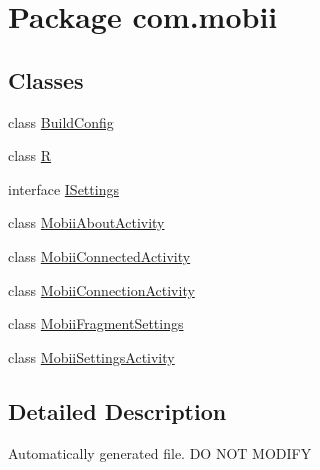 \hypertarget{namespacecom_1_1mobii}{\section{Package com.\-mobii}
\label{namespacecom_1_1mobii}
}
\subsection*{Classes}
\begin{DoxyCompactItemize}
\item 
class \hyperlink{classcom_1_1mobii_1_1_build_config}{Build\-Config}
\item 
class \hyperlink{classcom_1_1mobii_1_1_r}{R}
\item 
interface \hyperlink{interfacecom_1_1mobii_1_1_i_settings}{I\-Settings}
\item 
class \hyperlink{classcom_1_1mobii_1_1_mobii_about_activity}{Mobii\-About\-Activity}
\item 
class \hyperlink{classcom_1_1mobii_1_1_mobii_connected_activity}{Mobii\-Connected\-Activity}
\item 
class \hyperlink{classcom_1_1mobii_1_1_mobii_connection_activity}{Mobii\-Connection\-Activity}
\item 
class \hyperlink{classcom_1_1mobii_1_1_mobii_fragment_settings}{Mobii\-Fragment\-Settings}
\item 
class \hyperlink{classcom_1_1mobii_1_1_mobii_settings_activity}{Mobii\-Settings\-Activity}
\end{DoxyCompactItemize}


\subsection{Detailed Description}
Automatically generated file. D\-O N\-O\-T M\-O\-D\-I\-F\-Y 